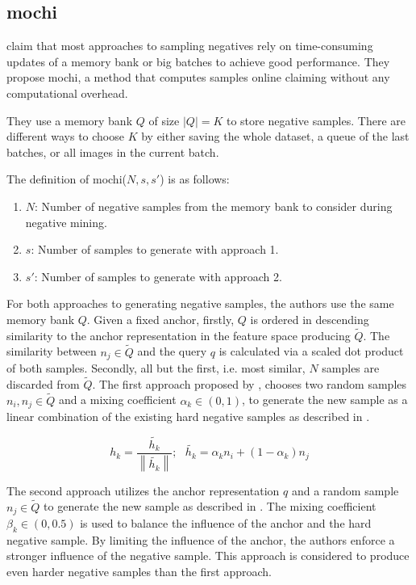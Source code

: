 \subsection{\acl{mochi}}\label{subsec:MoCHi}

\citet{mochi_2020} claim that most approaches to sampling negatives rely on 
time-consuming updates of a memory bank or big batches to achieve good performance.
They propose \ac{mochi}, a method that computes samples online claiming without any computational overhead.

They use a memory bank $Q$ of size $| Q | = K$ to store negative samples.
There are different ways to choose $K$ by either saving the whole dataset, a queue of the last batches,
or all images in the current batch.

The definition of \ac{mochi}($N, s, s'$) is as follows:
\begin{enumerate}
    \item $N$: Number of negative samples from the memory bank to consider during negative mining.
    \item $s$: Number of samples to generate with approach 1.
    \item $s'$: Number of samples to generate with approach 2.
\end{enumerate}
For both approaches to generating negative samples, the authors use the same memory bank $Q$.
Given a fixed anchor, firstly, $Q$ is ordered in descending similarity to the anchor representation    
in the feature space producing $\tilde{Q}$.
The similarity between $n_j \in \tilde{Q}$ and the query $q$ is calculated via 
a scaled dot product of both samples.
Secondly, all but the first, i.e. most similar, $N$ samples are discarded from $\tilde{Q}$.
The first approach proposed by \citeauthor{mochi_2020}, chooses two random samples $n_i, n_j \in \tilde{Q}$ 
and a mixing coefficient $\alpha_k \in (0,1)$, 
to generate the new sample as a linear combination of the existing hard negative samples 
as described in .

\begin{equation}
    h_k = \frac{\tilde{h_k}}{\left\| \tilde{h_k}  \right\|}; \text{  } \tilde{h_k} = \alpha_k n_i + (1-\alpha_k)n_j
    \label{eq:mochi_appr1}
\end{equation}

The second approach utilizes the anchor representation $q$ 
and a random sample $n_j \in \tilde{Q}$ to generate the new sample as described in .
The mixing coefficient $\beta_k \in (0,0.5)$ is used to balance the influence of the anchor 
and the hard negative sample.
By limiting the influence of the anchor, the authors enforce a stronger influence of the negative sample.
This approach is considered to produce even harder negative samples than the first approach.

